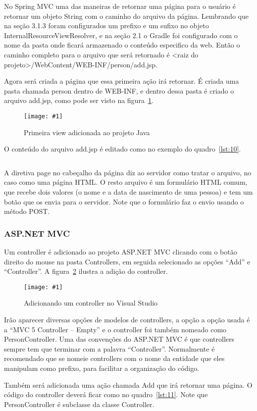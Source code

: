 \documentclass[a4paper,12pt]{article}
\newenvironment{simple}%
{\noindent}%
{\par\noindent}
\newcommand{\figura}[3] {
	\begin{figure}[H]
		\centering
		\texttt{[image: \#1]}
		\caption{#2}
		\label{#3}
	\end{figure}
	\FloatBarrier
}
\newcommand{\jspcode}[3] {
	\begin{simple}
	\inputminted[fontsize=\footnotesize]{jsp}{#1}
	\captionof{listing}{#2}
	\label{#3}
	\end{simple}
	\FloatBarrier
}
\begin{document}
No Spring MVC uma das maneiras de retornar uma página para o usuário é retornar um objeto String com o caminho do arquivo da página. Lembrando que na seção 3.1.3 foram configurados um prefixo e um sufixo no objeto InternalResourceViewResolver, e na seção 2.1 o Gradle foi configurado com o nome da pasta onde ficará armazenado o conteúdo especifico da web. Então o caminho completo para o arquivo que será retornado é <raiz do projeto>/WebContent/WEB-INF/person/add.jsp.

Agora será criada a página que essa primeira ação irá retornar. É criada uma pasta chamada person dentro de WEB-INF, e dentro dessa pasta é criado o arquivo add.jsp, como pode ser visto na figura~\ref{fig:24}.

\figura{24.png}{Primeira view adicionada ao projeto Java}{fig:24}

O conteúdo do arquivo add.jsp é editado como no exemplo do quadro~\ref{lst:10}.

\jspcode{code/10.txt}{Arquivo add.jsp}{lst:10}

A diretiva page no cabeçalho da página diz ao servidor como tratar o arquivo, no caso como uma página HTML. O resto arquivo é um formulário HTML comum, que recebe dois valores (o nome e a data de nascimento de uma pessoa) e tem um botão que os envia para o servidor. Note que o formulário faz o envio usando o método POST.

\subsubsection{ASP.NET MVC}

Um controller é adicionado ao projeto ASP.NET MVC clicando com o botão direito do mouse na pasta Controllers, em seguida selecionado as opções “Add” e “Controller”. A figura~\ref{fig:25} ilustra a adição do controller.

\figura{25.png}{Adicionando um controller no Visual Studio}{fig:25}

Irão aparecer diversas opções de modelos de controllers, a opção a opção usada é a “MVC 5 Controller – Empty” e o controller foi também nomeado como PersonController. Uma das convenções do ASP.NET MVC é que controllers sempre tem que terminar com a palavra “Controller”. Normalmente é recomendado que se nomeie controllers com o nome da entidade que eles manipulam como prefixo, para facilitar a organização do código.

Também será adicionada uma ação chamada Add que irá retornar uma página. O código do controller deverá ficar como no quadro~\ref{lst:11}. Note que PersonController é subclasse da classe Controller.
\end{document}
